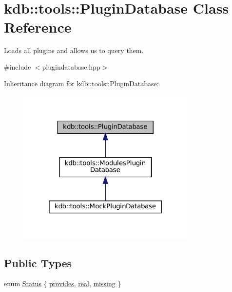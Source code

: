 \hypertarget{classkdb_1_1tools_1_1PluginDatabase}{}\section{kdb\+::tools\+::Plugin\+Database Class Reference}
\label{classkdb_1_1tools_1_1PluginDatabase}


Loads all plugins and allows us to query them.  




{\ttfamily \#include $<$plugindatabase.\+hpp$>$}



Inheritance diagram for kdb\+::tools\+::Plugin\+Database\+:
\nopagebreak
\begin{figure}[H]
\begin{center}
\leavevmode
\includegraphics[width=253pt]{classkdb_1_1tools_1_1PluginDatabase__inherit__graph}
\end{center}
\end{figure}
\subsection*{Public Types}
\begin{DoxyCompactItemize}
\item 
enum \mbox{\hyperlink{classkdb_1_1tools_1_1PluginDatabase_afc91ff760616ee83c6afb70e5a2f0601}{Status}} \{ \mbox{\hyperlink{classkdb_1_1tools_1_1PluginDatabase_afc91ff760616ee83c6afb70e5a2f0601a73ff10d6a07213c277db4326b3df6c4b}{provides}}, 
\mbox{\hyperlink{classkdb_1_1tools_1_1PluginDatabase_afc91ff760616ee83c6afb70e5a2f0601a2b7279a50ed80231a60b0435340c31a8}{real}}, 
\mbox{\hyperlink{classkdb_1_1tools_1_1PluginDatabase_afc91ff760616ee83c6afb70e5a2f0601ae789aaff1847ebb77eecb027c5ee0401}{missing}}
 \}
\end{DoxyCompactItemize}
